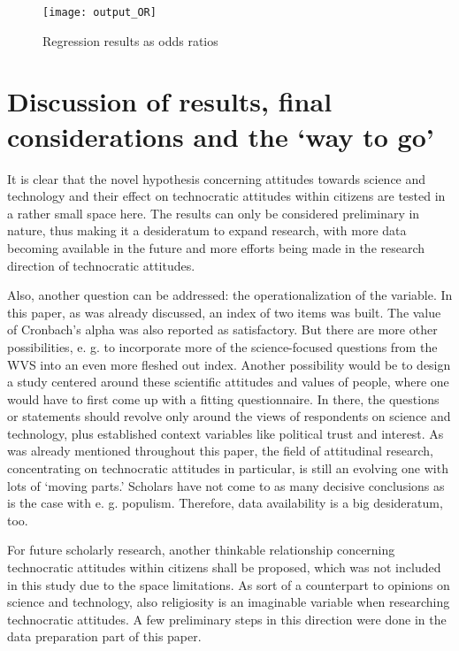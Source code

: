 \documentclass[
  12pt,
  english,
]{article}
\begin{document}
\begin{figure}

{\centering \texttt{[image: output\_OR]} 

}

\caption{Regression results as odds ratios}\label{fig:insert graphics: OR table}
\end{figure}

\hypertarget{discussion-of-results-final-considerations-and-the-way-to-go}{%
\section{Discussion of results, final considerations and the `way to
go'}\label{discussion-of-results-final-considerations-and-the-way-to-go}}

It is clear that the novel hypothesis concerning attitudes towards
science and technology and their effect on technocratic attitudes within
citizens are tested in a rather small space here. The results can only
be considered preliminary in nature, thus making it a desideratum to
expand research, with more data becoming available in the future and
more efforts being made in the research direction of technocratic
attitudes.

Also, another question can be addressed: the operationalization of the
variable. In this paper, as was already discussed, an index of two items
was built. The value of Cronbach's alpha was also reported as
satisfactory. But there are more other possibilities, e. g. to
incorporate more of the science-focused questions from the WVS into an
even more fleshed out index. Another possibility would be to design a
study centered around these scientific attitudes and values of people,
where one would have to first come up with a fitting questionnaire. In
there, the questions or statements should revolve only around the views
of respondents on science and technology, plus established context
variables like political trust and interest. As was already mentioned
throughout this paper, the field of attitudinal research, concentrating
on technocratic attitudes in particular, is still an evolving one with
lots of `moving parts.' Scholars have not come to as many decisive
conclusions as is the case with e. g. populism. Therefore, data
availability is a big desideratum, too.

For future scholarly research, another thinkable relationship concerning
technocratic attitudes within citizens shall be proposed, which was not
included in this study due to the space limitations. As sort of a
counterpart to opinions on science and technology, also religiosity is
an imaginable variable when researching technocratic attitudes. A few
preliminary steps in this direction were done in the data preparation
part of this paper.
\end{document}
